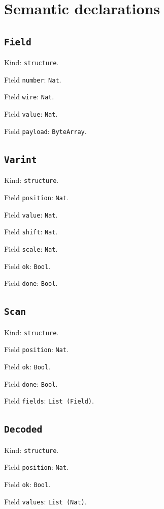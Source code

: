 \documentclass[11pt]{article}
\begin{document}
\section*{Semantic declarations}
\subsection*{\texttt{Field}}
\noindent Kind: \texttt{structure}.\par
\noindent Field \texttt{number}: \texttt{Nat}.\par
\noindent Field \texttt{wire}: \texttt{Nat}.\par
\noindent Field \texttt{value}: \texttt{Nat}.\par
\noindent Field \texttt{payload}: \texttt{ByteArray}.\par
\subsection*{\texttt{Varint}}
\noindent Kind: \texttt{structure}.\par
\noindent Field \texttt{position}: \texttt{Nat}.\par
\noindent Field \texttt{value}: \texttt{Nat}.\par
\noindent Field \texttt{shift}: \texttt{Nat}.\par
\noindent Field \texttt{scale}: \texttt{Nat}.\par
\noindent Field \texttt{ok}: \texttt{Bool}.\par
\noindent Field \texttt{done}: \texttt{Bool}.\par
\subsection*{\texttt{Scan}}
\noindent Kind: \texttt{structure}.\par
\noindent Field \texttt{position}: \texttt{Nat}.\par
\noindent Field \texttt{ok}: \texttt{Bool}.\par
\noindent Field \texttt{done}: \texttt{Bool}.\par
\noindent Field \texttt{fields}: \texttt{List (Field)}.\par
\subsection*{\texttt{Decoded}}
\noindent Kind: \texttt{structure}.\par
\noindent Field \texttt{position}: \texttt{Nat}.\par
\noindent Field \texttt{ok}: \texttt{Bool}.\par
\noindent Field \texttt{values}: \texttt{List (Nat)}.\par
\end{document}

